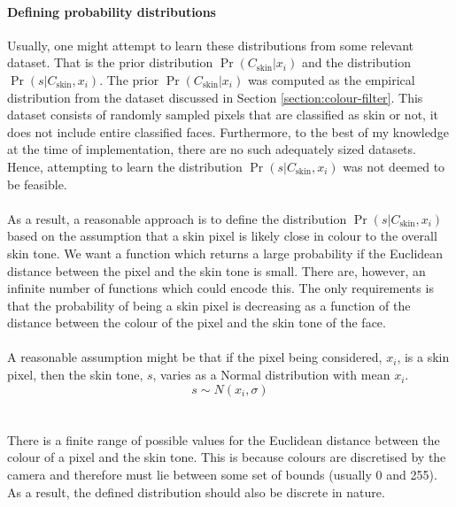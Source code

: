 \paragraph{Defining probability distributions}
Usually, one might attempt to learn these distributions from some relevant dataset. That is the prior distribution $\Pr(C_\mathrm{skin}|x_i)$ and the distribution $\Pr(s|C_\mathrm{skin}, x_i)$.
The prior $\Pr(C_\mathrm{skin}|x_i)$ was computed as the empirical distribution from 
the dataset discussed in Section \ref{section:colour-filter}. This dataset consists of randomly sampled pixels that are classified as skin or not, it does not include entire classified faces.
Furthermore, to the best of my knowledge at the time of implementation, there are no such adequately sized datasets. Hence, attempting to learn the distribution $\Pr(s|C_\mathrm{skin}, x_i)$ was not deemed to be feasible.
\\\\
As a result, a reasonable approach is to define the distribution $\Pr(s|C_\mathrm{skin}, x_i)$ based on the assumption that a skin pixel is likely close in colour to the overall skin tone. We want a function which returns a large probability if the Euclidean distance between the pixel and the skin tone is small.
There are, however, an infinite number of functions which could encode this. The only requirements is that the probability of being a skin pixel is  decreasing as a function of the distance between the colour of the pixel and the skin tone of the face. 
\\\\
A reasonable assumption might be that if the pixel being considered, $x_i$, is a skin pixel, then the skin tone, $s$, varies as a Normal distribution with mean $x_i$. 
\begin{equation*}
   s \sim N(x_i, \sigma) 
\end{equation*}
\\\\
There is a finite range of possible values for the Euclidean distance between the colour of a pixel and the skin tone. This is because colours are discretised by the camera and therefore must lie between some set of bounds (usually 0 and 255). As a result, the defined distribution should also be discrete in nature.
\\\\ 

 


